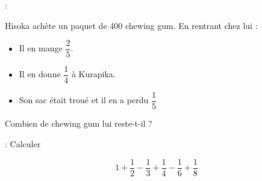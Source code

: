 \newcommand{\fracdplace}[3][1]{
\tikzmath{\den=#2; \ya =#3;  \rcl= #1 ; \pas=1/\den ; \yb =\ya +1; \dprt = \ya - \rcl * \pas; \y2 =\dprt +\pas; \fin =\dprt +17*\pas ; \grad = 0.1/\den ; } %
\begin{figure}[H]
    \centering
    \begin{tikzpicture}[scale=\den]
        \draw (\dprt,0) -- (\fin,0) node[midway, sloped]{};
        \foreach \x in {\dprt,\y2,...,\fin}
        {
          \pgfmathparse{int(Mod(\x * \den +\pas ,\den))}
          \ifnum\pgfmathresult>0
            \draw (\x,\grad) -- (\x,-\grad) ;
          \else 
            \draw[ultra thick] (\x,2*\grad) -- (\x,-2*\grad) ;
          \fi
        }
        \node (A) at (\ya,-2*\grad) [below] {\pgfmathprintnumber[use comma]{\ya}} ;
        \node (B) at (\yb,-2*\grad) [below] {\pgfmathprintnumber[use comma]{\yb}} ;
    \end{tikzpicture} 
\end{figure}}





 :    


Hisoka achète un paquet de 400 chewing gum. En rentrant chez lui :
\begin{itemize}
    \item Il en mange $\dfrac{2}{5}$.
    \item Il en donne $\dfrac{1}{4}$ à Kurapika.
    \item Son sac était troué et il en a perdu $\dfrac{1}{5}$
\end{itemize}
Combien de chewing gum lui reste-t-il ?

\exo{}{} :  Calculer  

$$1+\dfrac{1}{2}-\dfrac{1}{3}+\dfrac{1}{4}-\dfrac{1}{6}+\dfrac{1}{8}$$
